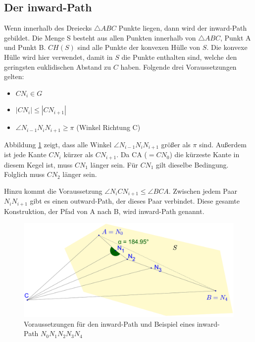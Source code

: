 \documentclass[a4paper,twoside]{IEEEtran}
\begin{document}
\subsection{Der inward-Path}
Wenn innerhalb des Dreiecks $\triangle{ABC} $ Punkte liegen, dann wird der inward-Path gebildet.
Die Menge S besteht aus allen Punkten innerhalb von $\triangle {ABC} $, Punkt A und Punkt B.
$CH(S) $ sind alle Punkte der konvexen Hülle von $S $. %
Die konvexe Hülle wird hier verwendet, damit in $S $ die Punkte enthalten sind, welche den geringsten euklidischen Abstand zu $C $ haben.
Folgende drei Voraussetzungen gelten:

\begin{itemize} %
	\item $CN_i \in G$
	\item $|CN_i| \leq |CN_{i+1}| $
	\item $\angle{N_{i-1}N_iN_{i+1}} \geq \pi $ (Winkel Richtung C)
\end{itemize} 


Abbildung \ref{fig:inward_path_prop} zeigt, dass alle Winkel $\angle{N_{i-1}N_iN_{i+1}} $ größer als $\pi $ sind.
Außerdem ist jede Kante $CN_i $ kürzer als $CN_{i+1}$. 
Da CA ($= CN_0 $) die kürzeste Kante in diesem Kegel ist, muss $CN_1 $ länger sein. 
Für $CN_1 $ gilt dieselbe Bedingung. 
Folglich muss $CN_2 $ länger sein.

Hinzu kommt die Voraussetzung $\angle{N_iCN_{i+1}} \leq \angle{BCA} $.
Zwischen jedem Paar $N_iN_{i+1} $ gibt es einen outward-Path, der dieses Paar verbindet.
Diese gesamte Konstruktion, der Pfad von A nach B, wird inward-Path genannt.

\begin{figure}[h!]
\centering
\includegraphics[width=1\linewidth]{inward_path_prop.eps}
\caption{Voraussetzungen für den inward-Path und Beispiel eines inward-Path $N_0N_1N_2N_3N_4 $}
\label{fig:inward_path_prop}
\end{figure}
\end{document}
